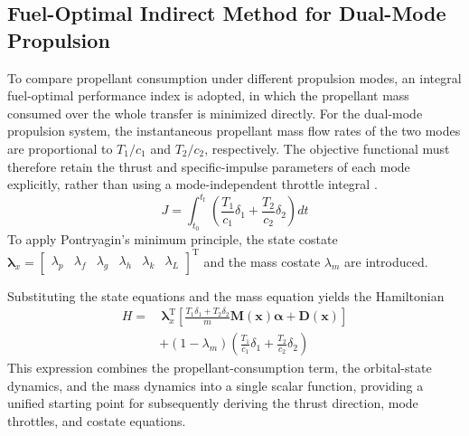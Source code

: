 \documentclass{IEEEtaes}
\begin{document}
\subsection{Fuel-Optimal Indirect Method for Dual-Mode Propulsion}
To compare propellant consumption under different propulsion modes, an integral fuel-optimal performance index is adopted, in which the propellant mass consumed over the whole transfer is minimized directly. For the dual-mode propulsion system, the instantaneous propellant mass flow rates of the two modes are proportional to $T_1/c_1$ and $T_2/c_2$, respectively. The objective functional must therefore retain the thrust and specific-impulse parameters of each mode explicitly, rather than using a mode-independent throttle integral \cite{cline2024a}.
\begin{equation}
J=\int_{t_0}^{t_{\mathrm{f}}}\left(\frac{T_1}{c_1}\delta_1+\frac{T_2}{c_2}\delta_2\right)dt
\end{equation}
To apply Pontryagin's minimum principle, the state costate $\bm{\lambda}_x=\begin{bmatrix}\lambda_p&\lambda_f&\lambda_g&\lambda_h&\lambda_k&\lambda_L\end{bmatrix}^{\mathrm{T}}$ and the mass costate $\lambda_m$ are introduced.

Substituting the state equations and the mass equation yields the Hamiltonian
\begin{equation}
\begin{aligned}
H=&\,\bm{\lambda}_x^{\mathrm{T}}\left[\frac{T_1\delta_1+T_2\delta_2}{m}\bm{M}(\bm{x})\bm{\alpha}+\bm{D}(\bm{x})\right]\\
&+(1-\lambda_m)\left(\frac{T_1}{c_1}\delta_1+\frac{T_2}{c_2}\delta_2\right)
\end{aligned}
\end{equation}
This expression combines the propellant-consumption term, the orbital-state dynamics, and the mass dynamics into a single scalar function, providing a unified starting point for subsequently deriving the thrust direction, mode throttles, and costate equations.
\end{document}
